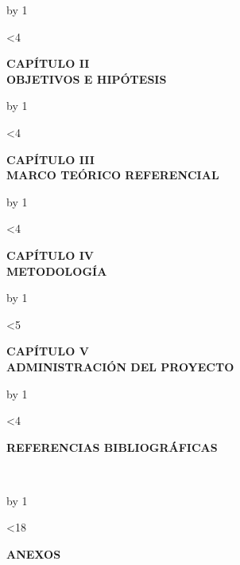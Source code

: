 \documentclass[12pt,a4paper]{article}
\makeatletter
\let\old@clearpage\clearpage
\renewcommand{\clearpage}{%
  \ifLineNumbers
    \old@clearpage
    \linenumbers
  \else
    \old@clearpage
  \fi
}
\newcommand{\blanklines}[1]{%
  \par
  \begingroup
  \@tempcnta=0
  \loop
    \advance\@tempcnta by 1
    \noindent\null\par
    \ifnum\@tempcnta<#1
  \repeat
  \endgroup
}
\makeatother
\begin{document}
\clearpage
\blanklines{4}
\setcounter{section}{2}
\setcounter{subsection}{0}
\begin{center}
\textbf{CAPÍTULO II} \\
 \textbf{OBJETIVOS E HIPÓTESIS}
\end{center}


\clearpage
\blanklines{4}
\setcounter{section}{3}
\setcounter{subsection}{0}
\begin{center}
\textbf{CAPÍTULO III} \\
 \textbf{MARCO TEÓRICO REFERENCIAL}
\end{center}


\clearpage
\blanklines{4}
\setcounter{section}{4}
\setcounter{subsection}{0}
\begin{center}
\textbf{CAPÍTULO IV}\\
\textbf{METODOLOGÍA}
\end{center}


\clearpage
\blanklines{5}
\setcounter{section}{5}
\setcounter{subsection}{0}
\begin{center}
\textbf{CAPÍTULO V}\\
\textbf{ADMINISTRACIÓN DEL PROYECTO}
\end{center}


% 

% 

\newpage
\blanklines{4}
\begin{center}
\textbf{REFERENCIAS BIBLIOGRÁFICAS}
\end{center}
~\par
\printbibliography[heading=none]
\clearpage
\newpage

\blanklines{18}
\begin{center}
\noindent \hspace*{0.5cm}\Large \textbf{ANEXOS}
\end{center}

\newpage

\end{document}
